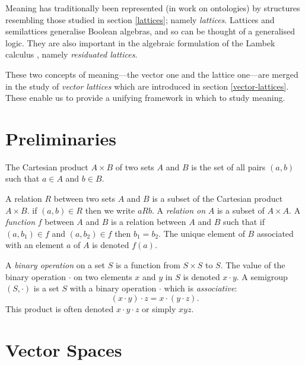 Meaning has traditionally been represented (in work on ontologies) by structures resembling those studied in section \ref{lattices}; namely \emph{lattices}. Lattices and semilattices generalise Boolean algebras, and so can be thought of a generalised logic. They are also important in the algebraic formulation of the Lambek calculus \cite{Lambek}, namely \emph{residuated lattices}.

These two concepts of meaning---the vector one and the lattice one---are merged in the study of \emph{vector lattices} which are introduced in section \ref{vector-lattices}. These enable us to provide a unifying framework in which to study meaning.
 
 \section{Preliminaries}

\begin{defn}
The Cartesian product $A \times B$ of two sets $A$ and $B$ is the set of all pairs $(a,b)$ such that $a \in A$ and $b \in B$.
\end{defn}

\begin{defn}
A relation $R$ between two sets $A$ and $B$ is a subset of the Cartesian product $A \times B$. if $(a,b) \in R$ then we write $aRb$. A \emph{relation on} $A$ is a subset of $A \times A$. A \emph{function} $f$ between $A$ and $B$ is a relation between $A$ and $B$ such that if $(a,b_1) \in f$ and $(a,b_2) \in f$ then $b_1 = b_2$. The unique element of $B$ associated with an element $a$ of $A$ is denoted $f(a)$.
\end{defn}

\begin{defn}[Semigroup]
A \emph{binary operation} on a set $S$ is a function from $S\times S$ to $S$. The value of the binary operation $\cdot$ on two elements $x$ and $y$ in $S$ is denoted $x \cdot y$. A semigroup $(S,\cdot)$ is a set $S$ with a binary operation $\cdot$ which is \emph{associative}:
$$(x\cdot y)\cdot z = x \cdot (y \cdot z).$$
This product is often denoted $x\cdot y \cdot z$ or simply $xyz$.
\end{defn}
 
\section{Vector Spaces}
\label{vectors}

